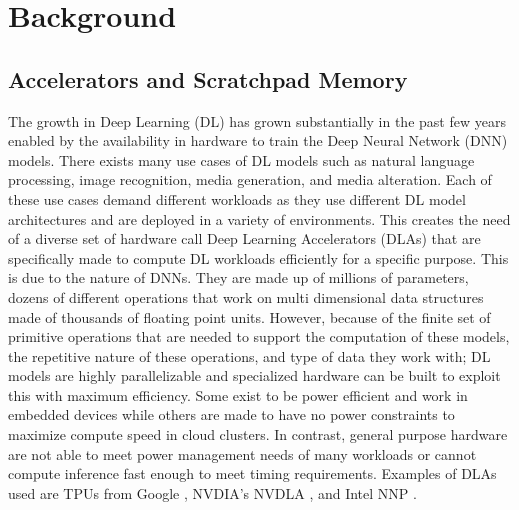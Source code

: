 
\chapter{Background} %

\label{Chapter1} %


\section{Accelerators and Scratchpad Memory}
The growth in Deep Learning (DL) has grown substantially in the past few years
enabled by the availability in hardware to train the Deep Neural Network (DNN)
models. There exists many use cases of DL models such as natural language
processing, image recognition, media generation, and media alteration. Each of
these use cases demand different workloads as they use different DL model
architectures and are deployed in a variety of environments. This creates the
need of a diverse set of hardware call Deep Learning Accelerators (DLAs) that
are specifically made to compute DL workloads efficiently for a specific
purpose. This is due to the nature of DNNs. They are made up of millions of
parameters, dozens of different operations that work on multi dimensional data
structures made of thousands of floating point units. However, because of the
finite set of primitive operations that are needed to support the computation
of these models, the repetitive nature of these operations, and type of data
they work with; DL models are highly parallelizable and specialized hardware
can be built to exploit this with maximum efficiency. Some exist to be power
efficient and work in embedded devices while others are made to have no power
constraints to maximize compute speed in cloud clusters. In contrast, general
purpose hardware are not able to meet power management needs of many workloads
or cannot compute inference fast enough to meet timing requirements. Examples
of DLAs used are TPUs from Google \cite{tensorflow}, NVDIA's NVDLA \cite{nvdla}, and Intel NNP \cite{nnp}.

